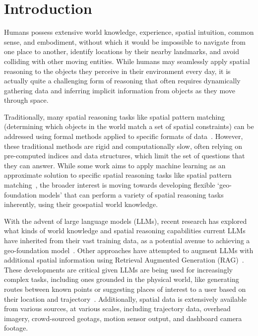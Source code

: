 \section{Introduction}
\label{section:introduction}

Humans possess extensive world knowledge, experience, spatial intuition, common sense, and embodiment, without which it would be impossible to navigate from one place to another, identify locations by their nearby landmarks, and avoid colliding with other moving entities.
While humans may seamlessly apply spatial reasoning to the objects they perceive in their environment every day, it is actually quite a challenging form of reasoning that often requires dynamically gathering data and inferring implicit information from objects as they move through space.

Traditionally, many spatial reasoning tasks like spatial pattern matching (determining which objects in the world match a set of spatial constraints) can be addressed using formal methods applied to specific formats of data~\cite{Papadias1998, Schwering2014, Duckham2023,Folkers2000, Chen2019, Fang2019, Minervino2023, Osul2023, Osul2023b}.
However, these traditional methods are rigid and computationally slow, often relying on pre-computed indices and data structures, which limit the set of questions that they can answer.
While some work aims to apply machine learning as an approximate solution to specific spatial reasoning tasks like spatial pattern matching~\cite{Schneider2024, Schneider2024b}, the broader interest is moving towards developing flexible `geo-foundation models' that can perform a variety of spatial reasoning tasks inherently, using their geospatial world knowledge.

With the advent of large language models (LLMs), recent research has explored what kinds of world knowledge and spatial reasoning capabilities current LLMs have inherited from their vast training data, as a potential avenue to achieving a geo-foundation model~\cite{Mai2024, Bhandari2023, Qi2023, Xie2023translating, Mooney2023,Cohn2023,Bang2023}.
Other approaches have attempted to augment LLMs with additional spatial information using Retrieval Augmented Generation (RAG)~\cite{Yu2025}. 
These developments are critical given LLMs are being used for increasingly complex tasks, including ones grounded in the physical world, like generating routes between known points or suggesting places of interest to a user based on their location and trajectory~\cite{Schneider2025,Yu2025}.
Additionally, spatial data is extensively available from various sources, at various scales, including trajectory data, overhead imagery, crowd-sourced geotags, motion sensor output, and dashboard camera footage.

